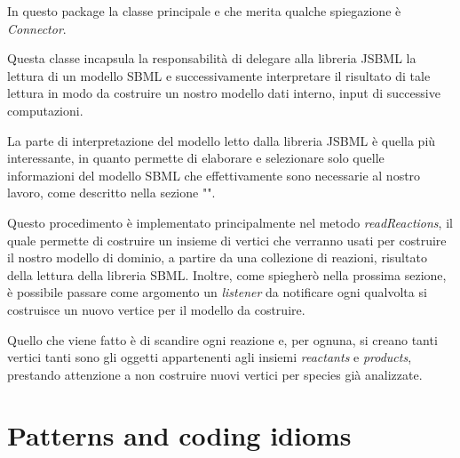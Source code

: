 In questo package la classe principale e che merita qualche
spiegazione \`e \emph{Connector}.

Questa classe incapsula la responsabilit\`a di delegare alla libreria
JSBML la lettura di un modello SBML e successivamente interpretare il
risultato di tale lettura in modo da costruire un nostro modello dati
interno, input di successive computazioni.

La parte di interpretazione del modello letto dalla libreria JSBML \`e
quella pi\`u interessante, in quanto permette di elaborare e
selezionare solo quelle informazioni del modello SBML che
effettivamente sono necessarie al nostro lavoro, come descritto nella
sezione "". 

Questo procedimento \`e implementato principalmente nel metodo
\emph{readReactions}, il quale permette di costruire un insieme di
vertici che verranno usati per costruire il nostro modello di dominio,
a partire da una collezione di reazioni, risultato della lettura della
libreria SBML. Inoltre, come spiegher\`o nella prossima sezione, \`e
possibile passare come argomento un \emph{listener} da notificare ogni
qualvolta si costruisce un nuovo vertice per il modello da costruire.

Quello che viene fatto \`e di scandire ogni reazione e, per ognuna, si
creano tanti vertici tanti sono gli oggetti appartenenti agli insiemi
\emph{reactants} e \emph{products}, prestando attenzione a non
costruire nuovi vertici per species gi\`a analizzate.

\section{Patterns and coding idioms}

